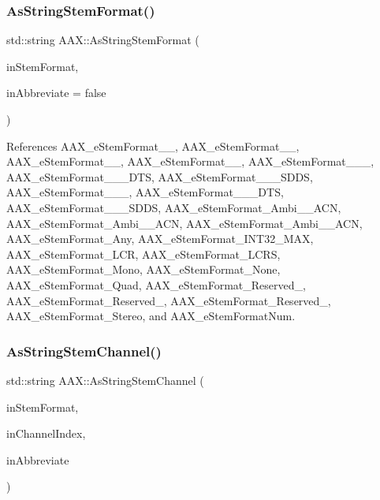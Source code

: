 \subsubsection{\texorpdfstring{AsStringStemFormat()}{AsStringStemFormat()}}
{\footnotesize\ttfamily std\+::string A\+A\+X\+::\+As\+String\+Stem\+Format (\begin{DoxyParamCaption}\item[{\mbox{\hyperlink{a00491_ad8af5ef008b2bd478add9a0acb0a1d85}{A\+A\+X\+\_\+\+E\+Stem\+Format}}}]{in\+Stem\+Format,  }\item[{bool}]{in\+Abbreviate = {\ttfamily false} }\end{DoxyParamCaption})\hspace{0.3cm}{\ttfamily [inline]}}



References A\+A\+X\+\_\+e\+Stem\+Format\+\_\+\_, A\+A\+X\+\_\+e\+Stem\+Format\+\_\+\_, A\+A\+X\+\_\+e\+Stem\+Format\+\_\+\_, A\+A\+X\+\_\+e\+Stem\+Format\+\_\+\_, A\+A\+X\+\_\+e\+Stem\+Format\+\_\+\_\+\_, A\+A\+X\+\_\+e\+Stem\+Format\+\_\+\_\+\_\+\+D\+TS, A\+A\+X\+\_\+e\+Stem\+Format\+\_\+\_\+\_\+\+S\+D\+DS, A\+A\+X\+\_\+e\+Stem\+Format\+\_\+\_\+\_, A\+A\+X\+\_\+e\+Stem\+Format\+\_\+\_\+\_\+\+D\+TS, A\+A\+X\+\_\+e\+Stem\+Format\+\_\+\_\+\_\+\+S\+D\+DS, A\+A\+X\+\_\+e\+Stem\+Format\+\_\+\+Ambi\+\_\+\_\+\+A\+CN, A\+A\+X\+\_\+e\+Stem\+Format\+\_\+\+Ambi\+\_\+\_\+\+A\+CN, A\+A\+X\+\_\+e\+Stem\+Format\+\_\+\+Ambi\+\_\+\_\+\+A\+CN, A\+A\+X\+\_\+e\+Stem\+Format\+\_\+\+Any, A\+A\+X\+\_\+e\+Stem\+Format\+\_\+\+I\+N\+T32\+\_\+\+M\+AX, A\+A\+X\+\_\+e\+Stem\+Format\+\_\+\+L\+CR, A\+A\+X\+\_\+e\+Stem\+Format\+\_\+\+L\+C\+RS, A\+A\+X\+\_\+e\+Stem\+Format\+\_\+\+Mono, A\+A\+X\+\_\+e\+Stem\+Format\+\_\+\+None, A\+A\+X\+\_\+e\+Stem\+Format\+\_\+\+Quad, A\+A\+X\+\_\+e\+Stem\+Format\+\_\+\+Reserved\+\_, A\+A\+X\+\_\+e\+Stem\+Format\+\_\+\+Reserved\+\_, A\+A\+X\+\_\+e\+Stem\+Format\+\_\+\+Reserved\+\_, A\+A\+X\+\_\+e\+Stem\+Format\+\_\+\+Stereo, and A\+A\+X\+\_\+e\+Stem\+Format\+Num.

\mbox{\label{a00852_adfab6bf193c09266ecec2069b8da0c5c}} 
\subsubsection{\texorpdfstring{AsStringStemChannel()}{AsStringStemChannel()}}
{\footnotesize\ttfamily std\+::string A\+A\+X\+::\+As\+String\+Stem\+Channel (\begin{DoxyParamCaption}\item[{\mbox{\hyperlink{a00491_ad8af5ef008b2bd478add9a0acb0a1d85}{A\+A\+X\+\_\+\+E\+Stem\+Format}}}]{in\+Stem\+Format,  }\item[{uint32\+\_\+t}]{in\+Channel\+Index,  }\item[{bool}]{in\+Abbreviate }\end{DoxyParamCaption})\hspace{0.3cm}{\ttfamily [inline]}}



